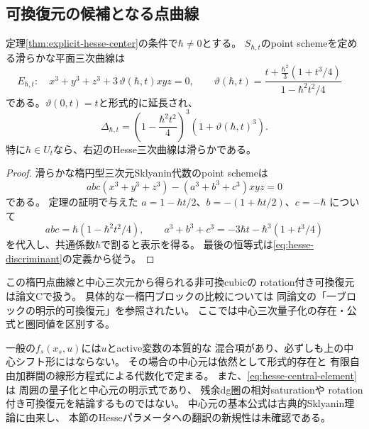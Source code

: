\subsection{可換復元の候補となる点曲線}
\begin{proposition}[楕円点曲線のHesseパラメータ]
\label{prop:hesse-point-cubic}
定理\ref{thm:explicit-hesse-center}の条件で$\hbar\ne0$とする。
$S_{\hbar,t}$のpoint schemeを定める滑らかな平面三次曲線は
\[
 E_{\hbar,t}:\quad
 x^3+y^3+z^3+3\,\vartheta(\hbar,t)xyz=0,
\quad
 \boxed{\quad
 \vartheta(\hbar,t)=
 \frac{t+\frac{\hbar^2}{3}(1+t^3/4)}
 {1-\hbar^2t^2/4}
 \quad}
 \tag{EP}\label{eq:hesse-point-parameter}
\]
である。$\vartheta(0,t)=t$と形式的に延長され、
\[
 \Delta_{\hbar,t}
 =\left(1-\frac{\hbar^2t^2}{4}\right)^3
  \left(1+\vartheta(\hbar,t)^3\right).
 \tag{ED}\label{eq:hesse-point-delta}
\]
特に$\hbar\in U_t$なら、右辺のHesse三次曲線は滑らかである。
\end{proposition}
\begin{proof}
滑らかな楕円型三次元Sklyanin代数のpoint schemeは
\[
 abc(x^3+y^3+z^3)-(a^3+b^3+c^3)xyz=0
\]
である\cite{SmithTate,DeLaetLeBruyn}。
定理の証明で与えた
$a=1-\hbar t/2$、$b=-(1+\hbar t/2)$、$c=-\hbar$
について
\[
 abc=\hbar(1-\hbar^2t^2/4),\qquad
 a^3+b^3+c^3
 =-3\hbar t-\hbar^3(1+t^3/4)
\]
を代入し、共通係数$\hbar$で割ると表示を得る。
最後の恒等式は\eqref{eq:hesse-discriminant}の定義から従う。
\end{proof}
\begin{remark}[幾何学的比較との関係]
この楕円点曲線と中心三次元から得られる非可換cubicの
rotation付き可換復元は論文Cで扱う。
具体的な一楕円ブロックの比較については
同論文の「一ブロックの明示的可換復元」を参照されたい。
ここでは中心三次量子化の存在・公式と圏同値を区別する。
\end{remark}

\begin{remark}[適用範囲と新規性]
\label{rem:hesse-scope}
一般の$f_s(x_s,u)$には$u$とactive変数の本質的な
混合項があり、必ずしも上の中心シフト形にはならない。
その場合の中心元は依然として形式的存在と
有限自由加群間の線形方程式による代数化で定まる。
また、\eqref{eq:hesse-central-element}は
周囲の量子化と中心元の明示式であり、
残余dg圏の相対saturationや
rotation付き可換復元を結論するものではない。
中心元の基本公式は古典的Sklyanin理論に由来し、
本節のHesseパラメータへの翻訳の新規性は未確認である。
\end{remark}
